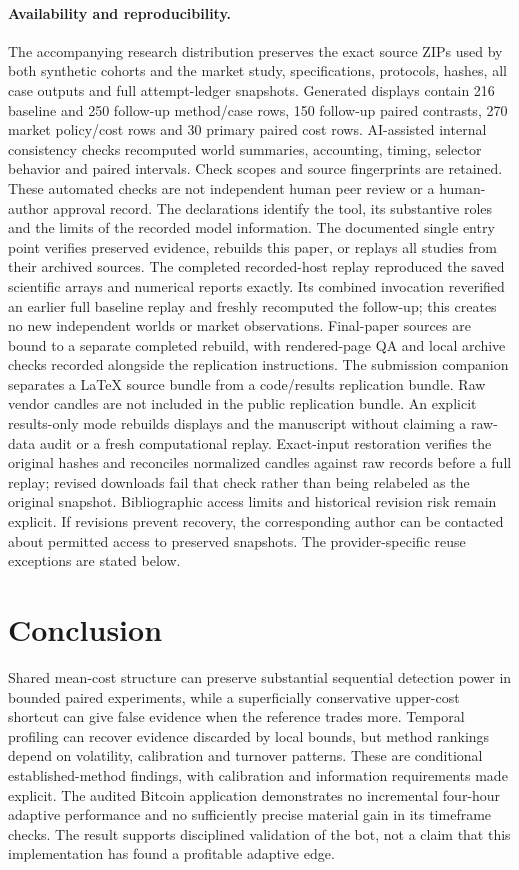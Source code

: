 \paragraph{Availability and reproducibility.}
The accompanying research distribution preserves the exact source ZIPs used by both
synthetic cohorts and the market study, specifications, protocols, hashes,
all case outputs and full attempt-ledger snapshots. Generated displays contain
216 baseline and 250 follow-up method/case rows, 150 follow-up paired contrasts,
270 market policy/cost rows and 30 primary paired cost rows.
AI-assisted internal consistency checks recomputed world summaries, accounting,
timing, selector behavior and paired intervals. Check scopes and source
fingerprints are retained. These automated checks are not independent human
peer review or a human-author approval record. The declarations identify the
tool, its substantive roles and the limits of the recorded model information.
The documented single entry point verifies preserved evidence, rebuilds this
paper, or replays all studies from their archived sources. The completed
recorded-host replay reproduced the saved scientific arrays and numerical
reports exactly. Its combined invocation reverified an earlier full baseline
replay and freshly recomputed the follow-up; this creates no new independent
worlds or market observations. Final-paper sources are bound to a separate
completed rebuild, with rendered-page QA and local archive checks recorded
alongside the replication instructions. The submission companion separates a
LaTeX source bundle from a code/results replication bundle. Raw vendor candles
are not included in the public replication bundle. An explicit results-only
mode rebuilds displays and the manuscript without claiming a raw-data audit or
a fresh computational replay. Exact-input restoration verifies the original
hashes and reconciles normalized candles against raw records before a full
replay; revised downloads fail that check rather than being relabeled as the
original snapshot. Bibliographic access limits and historical revision risk
remain explicit. If revisions prevent recovery, the corresponding author can
be contacted about permitted access to preserved snapshots. The provider-specific
reuse exceptions are stated below.

\section{Conclusion}

Shared mean-cost structure can preserve substantial sequential detection power
in bounded paired experiments, while a superficially conservative upper-cost
shortcut can give false evidence when the reference trades more. Temporal
profiling can recover evidence discarded by local bounds, but method rankings
depend on volatility, calibration and turnover patterns. These are conditional
established-method findings, with calibration and information requirements made
explicit. The audited Bitcoin application demonstrates no
incremental four-hour adaptive performance and no sufficiently precise material
gain in its timeframe checks. The result supports disciplined validation of the
bot, not a claim that this implementation has found a profitable adaptive edge.
